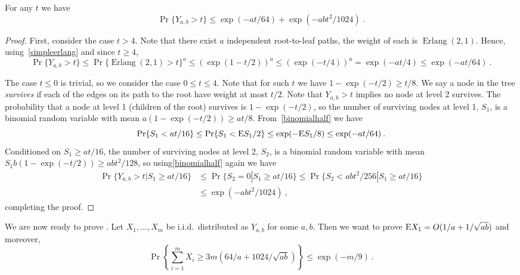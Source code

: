 \documentclass{patmorin}
\DeclareMathOperator{\erlang}{Erlang}
\begin{document}
\begin{lem}
\label{lem:yabconc}
For any $t$ we have
\[
\Pr\{Y_{a,b}>t\} \leq \exp(-at/64)+\exp(-abt^2/1024)\:.
\]
\end{lem}
\begin{proof}
First, consider the case $t>4$.
Note that there exist $a$ independent root-to-leaf paths, the weight of each is $\erlang(2,1)$.
Hence, using~\eqref{simpleerlang} and since $t\geq4$,
\[
\Pr\{Y_{a,b}>t\}
\leq
\Pr\{\erlang(2,1)>t\}^a
\leq
(\exp(1-t/2))^a
\leq
(\exp(-t/4))^a
=\exp(-at/4)
\leq\exp(-at/64)\:.
\]

The case $t\leq 0$ is trivial, so we consider the case $0\leq t\leq 4$.
Note that for such $t$ we have $1-\exp(-t/2)\geq t/8$.
We say a node in the tree \emph{survives} if each of the edges on its path to the root
have weight at most $t/2$.
Note that $Y_{a,b}>t$ implies no node at level 2 survives.
The probability that a node at level 1 (children of the root) survives is $1-\exp(-t/2)$,
so the number of surviving nodes at level 1, $S_1$, is a binomial random variable with mean $a(1-\exp(-t/2))\geq at/8$.
From~\eqref{binomialhalf} we have
\[
\Pr\{S_1 < at/16\}
\leq
\Pr\{S_1 < \mathrm{E} S_1 / 2\}
\leq
\exp(-\mathrm{E} S_1/8)
\leq 
\exp(-at/64)\:.
\]
Conditioned on $S_1\geq at/16$, the number of surviving nodes at level 2, $S_2$, is a binomial random variable with mean
$S_1b(1-\exp(-t/2))\geq abt^2/128$, so using\eqref{binomialhalf} again we have
\begin{align*}
\Pr\{Y_{a,b}>t | S_1\geq at/16\}
& \leq
\Pr\{S_2=0 | S_1\geq at/16\}
\leq
\Pr\{S_2<abt^2/256 | S_1\geq at/16\} \\
& \leq
\exp(-abt^2/1024)\:,
\end{align*}
completing the proof.
\end{proof}

We are now ready to prove
.
Let $X_1,\dots,X_m$ be i.i.d.\ distributed as $Y_{a,b}$ for some $a,b$.
Then we want to prove
$\mathrm{E} X_1 =O(1/a+1/\sqrt{ab})$ and moreover,
\[
\Pr\left\{\sum_{i=1}^m X_i \geq 3 m (64/a + 1024/\sqrt{ab}) \right\}
\leq
\exp(-m/9)\:.
\]
\end{document}
